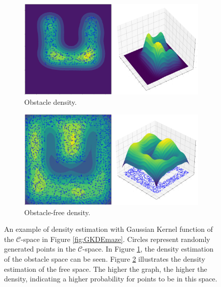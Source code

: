 \documentclass{ctuthesis}
\begin{document}
\begin{figure}[!ht]
  \centering 
  \begin{subfigure}[b]{1\textwidth}
      \includegraphics[width=\textwidth]{figChap4/GKDE_obsU.pdf}
      \caption{Obstacle density.}
      \label{fig:GKDEobstacleSpace}
  \end{subfigure}  
  \begin{subfigure}[b]{1\textwidth}
      \includegraphics[width=\textwidth]{figChap4/GKDE_freeU.pdf}
      \caption{Obstacle-free density.}
      \label{fig:GKDEfreeSpace}
  \end{subfigure}
  \caption{An example of density estimation with Gaussian Kernel function 
  of the $\mathcal{C}$-space in Figure \ref{fig:GKDEmaze}. 
  Circles represent randomly generated points in the $\mathcal{C}$-space. 
  In Figure \ref{fig:GKDEobstacleSpace}, the density estimation of the 
  obstacle space can be seen. 
  Figure \ref{fig:GKDEfreeSpace} illustrates the density estimation of the free space. 
  The higher the graph, 
  the higher the density, indicating a higher probability for points to be in this space.}
  \label{fig:GKDEdensity}
\end{figure}

\end{document}
